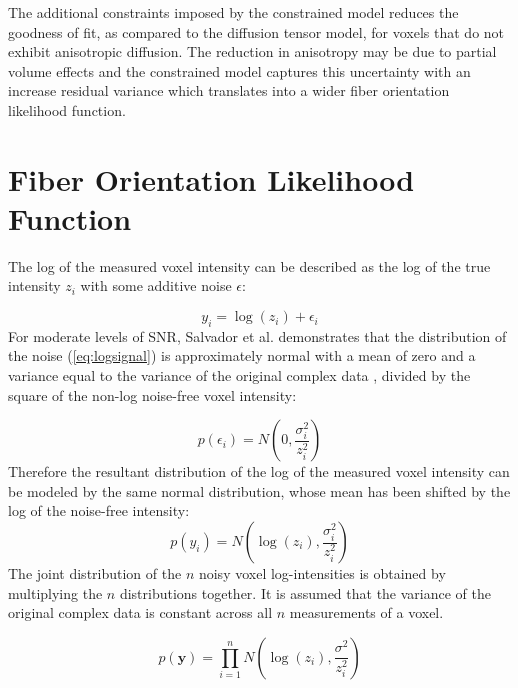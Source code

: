 The additional constraints imposed by the constrained model reduces the goodness of fit, as compared to the diffusion tensor model, for voxels that do not exhibit anisotropic diffusion.  The reduction in anisotropy may be due to partial volume effects and the constrained model captures this uncertainty with an increase residual variance which translates into a wider fiber orientation likelihood function.

\section{Fiber Orientation Likelihood Function}

The log of the measured voxel intensity can be described as the log of the true intensity $z_i$ with some additive noise $\epsilon$:

\begin{equation} \label{eq:logsignal}
y_i = \log(z_i) + \epsilon_i
\end{equation}
%
%
For moderate levels of SNR, Salvador et al. \cite{salvador} demonstrates that the distribution of the noise (\ref{eq:logsignal}) is approximately normal with a mean of zero and a variance equal to the variance of the original complex data \cite{salvador}, divided by the square of the non-log noise-free voxel intensity:

\begin{equation} \label{eq:noisepdf}
p(\epsilon_i) = N \left( 0, \frac{\sigma_i^2}{z_i^2} \right)
\end{equation}
%
%
Therefore the resultant distribution of the log of the measured voxel intensity can be modeled by the same normal distribution, whose mean has been shifted by the log of the noise-free intensity:
\begin{equation} \label{eq:signalpdf}
p(y_i) = N\left( \log(z_i), \frac{\sigma_i^2}{z_i^2} \right)
\end{equation}
%
%
The joint distribution of the $n$ noisy voxel log-intensities is obtained by multiplying the $n$ distributions together.  It is assumed that the variance of the original complex data is constant across all $n$ measurements of a voxel.

\begin{equation} \label{eq:jointsignalpdf}
p(\mathbf{y}) = \prod_{i=1}^{n}N\left( \log(z_i), \frac{\sigma^2}{z_i^2} \right)
\end{equation}


